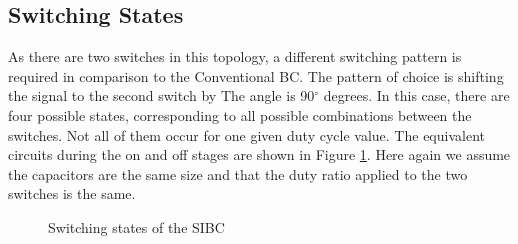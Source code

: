 \subsection{Switching States}
As there are two switches in this topology, a different switching pattern is required in comparison to the Conventional BC. The pattern of choice is shifting the signal to the second switch by The angle is 90$^\circ$ degrees.
In this case, there are four possible states, corresponding to all possible combinations between the switches. Not all of them occur for one given duty cycle value. 
The equivalent circuits during the on and off stages are shown in Figure \ref{fig:CTLBC_States}. Here again we assume the capacitors are the same size and that the duty ratio applied to the two switches is the same. 
\vspace{-5mm}
\begin{figure}[H]%
    \centering
    \qquad
   \qquad
    \qquad
    \caption{Switching states of the SIBC}%
     \label{fig:CTLBC_States}%
     
\end{figure}
